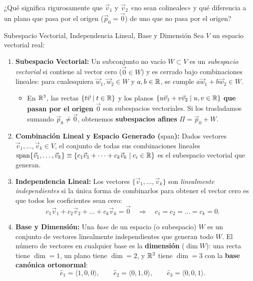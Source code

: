 \documentclass[11pt,letterpaper]{article}
\begin{document}
¿Qué significa rigurosamente que $\vec{v}_1$ y $\vec{v}_2$ «no sean colineales» y qué diferencia a un plano que pasa por el origen ($\vec{p}_0 = \vec{0}$) de uno que no pasa por el origen?

\begin{theorembox}{Subespacio Vectorial, Independencia Lineal, Base y Dimensión}
Sea $V$ un espacio vectorial real:
\begin{enumerate}
    \item \textbf{Subespacio Vectorial:} Un subconjunto no vacío $W \subset V$ es un \emph{subespacio vectorial} si contiene al vector cero ($\vec{0} \in W$) y es cerrado bajo combinaciones lineales: para cualesquiera $\vec{w}_1, \vec{w}_2 \in W$ y $a, b \in \mathbb{R}$, se cumple $a\vec{w}_1 + b\vec{w}_2 \in W$.
    \begin{itemize}
        \item En $\mathbb{R}^3$, las rectas $\{t\vec{v} \mid t \in \mathbb{R}\}$ y los planos $\{u\vec{v}_1 + v\vec{v}_2 \mid u,v \in \mathbb{R}\}$ \textbf{que pasan por el origen $\vec{0}$} son subespacios vectoriales. Si los trasladamos sumando $\vec{p}_0 \neq \vec{0}$, obtenemos \textbf{subespacios afines} $\Pi = \vec{p}_0 + W$.
    \end{itemize}
    \item \textbf{Combinación Lineal y Espacio Generado ($\text{span}$):} Dados vectores $\vec{v}_1, \dots, \vec{v}_k \in V$, el conjunto de todas sus combinaciones lineales $\text{span}\{\vec{v}_1, \dots, \vec{v}_k\} \equiv \{c_1\vec{v}_1 + \dots + c_k\vec{v}_k \mid c_i \in \mathbb{R}\}$ es el subespacio vectorial que generan.
    \item \textbf{Independencia Lineal:} Los vectores $\{\vec{v}_1, \dots, \vec{v}_k\}$ son \emph{linealmente independientes} si la única forma de combinarlos para obtener el vector cero es que todos los coeficientes sean cero:
    \[
    c_1\vec{v}_1 + c_2\vec{v}_2 + \dots + c_k\vec{v}_k = \vec{0} \quad \Longrightarrow \quad c_1 = c_2 = \dots = c_k = 0.
    \]
    \item \textbf{Base y Dimensión:} Una \emph{base} de un espacio (o subespacio) $W$ es un conjunto de vectores linealmente independientes que generan todo $W$. El número de vectores en cualquier base es la \textbf{dimensión} ($\dim W$): una recta tiene $\dim = 1$, un plano tiene $\dim = 2$, y $\mathbb{R}^3$ tiene $\dim = 3$ con la \textbf{base canónica ortonormal}:
    \[
    \hat{e}_1 = \langle 1, 0, 0 \rangle, \qquad \hat{e}_2 = \langle 0, 1, 0 \rangle, \qquad \hat{e}_3 = \langle 0, 0, 1 \rangle.
    \]
\end{enumerate}
\end{theorembox}
\end{document}
